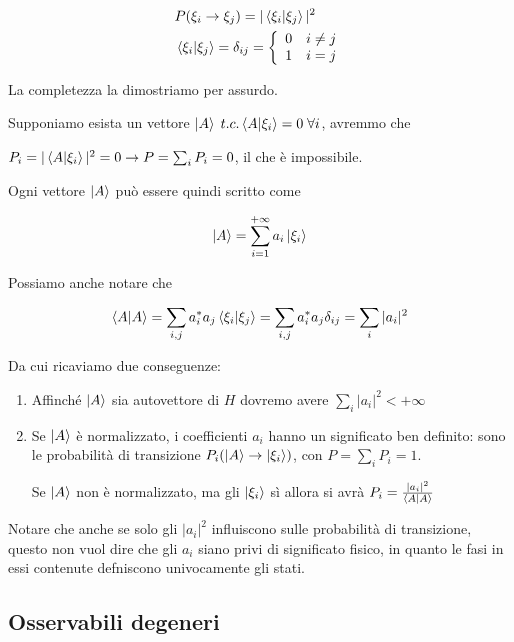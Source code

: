 \begin{align}
{}&P(\xi_i \rightarrow \xi_j)= |\braket{\xi_i|\xi_j}|^2 \\
&\braket{\xi_i|\xi_j} = \delta_{ij}= \left\{
\begin{array}{cc}
0 \quad i \neq j \\
1 \quad i = j
\end{array}
\right.
\end{align}


\bigskip

La completezza la dimostriamo per assurdo.

Supponiamo esista un vettore $\ket{A} \; t.c. \braket{A|\xi_i}=0 \; \forall i$, avremmo che

 $P_i= |\braket{A|\xi_i}|^2=0 \rightarrow P= \sum_i P_i=0$, il che  è impossibile.

\bigskip

Ogni vettore $\ket{A}$ può essere quindi scritto come

\begin{align}
\ket{A}= \sum_{i=1}^{+\infty} a_i \ket{\xi_i}
\end{align}

Possiamo anche notare che 

\begin{align}
\braket{A|A}= \sum_{i,j} a_i^* a_j \braket{\xi_i|\xi_j} = \sum_{i,j} a_i^* a_j \delta_{ij} = \sum_{i} |a_i|^2
\end{align}

Da cui ricaviamo due conseguenze:

\begin{enumerate}
	\item Affinché $\ket{A}$ sia autovettore di $H$ dovremo avere $\sum_{i} |a_i|^2<+\infty$
	\item Se $\ket{A}$ è normalizzato, i coefficienti $a_i$ hanno un significato ben definito: sono le probabilità di transizione $P_i(\ket{A} \rightarrow \ket{\xi_i})$, con $P=\sum_i P_i=1$.
	
	 Se $\ket{A}$ non è normalizzato, ma gli $\ket{\xi_i}$ sì allora si avrà $P_i= \frac{|a_i|^2}{\braket{A|A}}$
\end{enumerate}

Notare che anche se solo gli $|a_i|^2$ influiscono sulle probabilità di transizione, questo non vuol dire che gli $a_i$ siano privi di significato fisico, in quanto le fasi in essi contenute defniscono univocamente gli stati.
	
	
\subsection{Osservabili degeneri}

